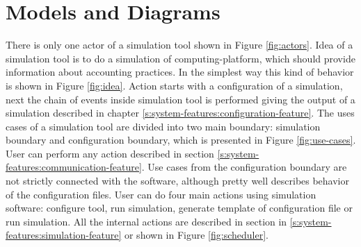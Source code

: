 \chapter{Models and Diagrams} \label{chp:models-and-diagrams}
	There is only one actor of a simulation tool shown in Figure \ref{fig:actors}. Idea of a simulation tool is to do a simulation of \gls{computing-platform}, which should provide information about accounting practices. In the simplest way this kind of behavior is shown in Figure \ref{fig:idea}. Action starts with a configuration of a simulation, next the chain of events inside simulation tool is performed giving the output of a simulation described in chapter \ref{s:system-features:configuration-feature}. The uses cases of a simulation tool are divided into two main boundary: simulation boundary and configuration boundary, which is presented in Figure \ref{fig:use-cases}. User can perform any action described in section \ref{s:system-features:communication-feature}. Use cases from the configuration boundary are not strictly connected with the software, although pretty well describes behavior of the configuration files. User can do four main actions using simulation software: configure tool, run simulation, generate template of configuration file or run simulation. All the internal actions are described in section in \ref{s:system-features:simulation-feature} or shown in Figure \ref{fig:scheduler}.